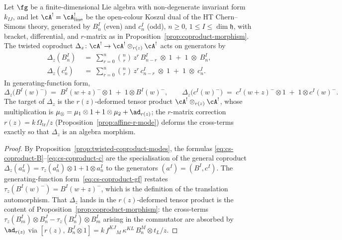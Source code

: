 \begin{proposition}
\label{prop:cs-twisted-coproduct}
Let\/ $\fg$ be a finite-dimensional Lie algebra with
non-degenerate invariant form\/ $k_{IJ}$, and let\/
$\cA^! = \cA^!_{\mathrm{line}}$ be the open-colour Koszul dual
of the HT Chern--Simons theory, generated by\/ $B^I_n$
\textup{(}even\textup{)} and\/ $c^I_n$
\textup{(}odd\textup{)}, $n \ge 0$, $1 \le I \le \dim \mathfrak{h}$,
with bracket, differential, and $r$-matrix as in
Proposition~\textup{\ref{prop:coproduct-morphism}}. The twisted
coproduct\/
$\Delta_z \colon \cA^! \to \cA^! \otimes_{r(z)} \cA^!$
acts on generators by
\begin{align}
 \Delta_z(B^I_n)
 &\;=\;
 \sum_{r=0}^{n} \binom{n}{r}\, z^r\, B^I_{n-r}
 \;\otimes\; 1
 \;+\;
 1 \;\otimes\; B^I_n,
 \label{eq:cs-coproduct-B}
 \\[4pt]
 \Delta_z(c^I_n)
 &\;=\;
 \sum_{r=0}^{n} \binom{n}{r}\, z^r\, c^I_{n-r}
 \;\otimes\; 1
 \;+\;
 1 \;\otimes\; c^I_n.
 \label{eq:cs-coproduct-c}
\end{align}
In generating-function form,
\begin{equation}\label{eq:cs-coproduct-gf}
 \Delta_z\bigl(B^I(w)^-\bigr)
 \;=\; B^I(w+z)^- \otimes 1 \;+\; 1 \otimes B^I(w)^-,
 \qquad
 \Delta_z\bigl(c^I(w)^-\bigr)
 \;=\; c^I(w+z)^- \otimes 1 \;+\; 1 \otimes c^I(w)^-.
\end{equation}
The target of\/ $\Delta_z$ is the\/ $r(z)$-deformed tensor
product\/ $\cA^! \otimes_{r(z)} \cA^!$, whose multiplication is
$\mu_{\otimes} = \mu_1 \otimes 1 + 1 \otimes \mu_2
+ \ad_{r(z)}$; the $r$-matrix correction\/
$r(z) = k\,\Omega_{\mathrm{tr}}/z$
\textup{(}Proposition~\textup{\ref{prop:affine-r-mode}}\textup{)}
deforms the cross-terms exactly so that\/ $\Delta_z$ is an algebra
morphism.
\end{proposition}

\begin{proof}
By Proposition~\ref{prop:twisted-coproduct-modes}, the formulas
\eqref{eq:cs-coproduct-B}--\eqref{eq:cs-coproduct-c} are the
specialisation of the general coproduct
$\Delta_z(a^I_n) = \tau_z(a^I_n) \otimes 1 + 1 \otimes a^I_n$
to the generators $(a^I) = (B^I, c^I)$. The
generating-function form~\eqref{eq:cs-coproduct-gf} restates
$\tau_z(B^I(w)^-) = B^I(w+z)^-$, which is the definition of the
translation automorphism. That $\Delta_z$ lands in the
$r(z)$-deformed tensor product is the content of
Proposition~\ref{prop:coproduct-morphism}:
the cross-terms $\tau_z(B^I_m) \otimes B^J_n
- \tau_z(B^J_n) \otimes B^I_m$ arising in the commutator are
absorbed by $\ad_{r(z)}$ via $[r(z),\, B^J_n \otimes 1]
= k\,f^{KJ}{}_M\,\kappa^{KL}\,B^M_n \otimes t_L/z$.
\end{proof}


